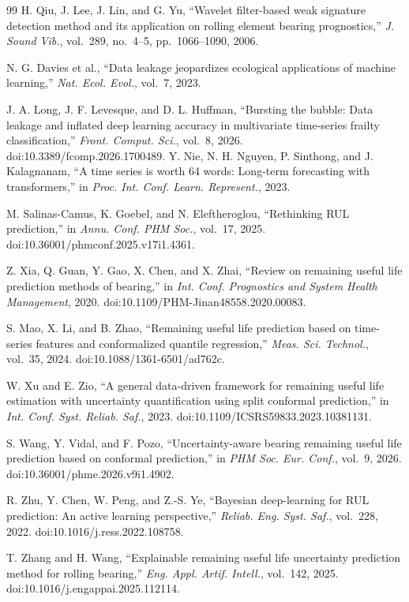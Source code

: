 \documentclass[pdflatex,sn-mathphys-num]{sn-jnl}
\begin{document}
\begin{thebibliography}{99}
H. Qiu, J. Lee, J. Lin, and G. Yu,
``Wavelet filter-based weak signature detection method and its application on rolling element bearing prognostics,''
\textit{J. Sound Vib.}, vol.~289, no.~4--5, pp.~1066--1090, 2006.

N. G. Davies et al.,
``Data leakage jeopardizes ecological applications of machine learning,''
\textit{Nat. Ecol. Evol.}, vol.~7, 2023.

J. A. Long, J. F. Levesque, and D. L. Huffman,
``Bursting the bubble: Data leakage and inflated deep learning accuracy in multivariate time-series frailty classification,''
\textit{Front. Comput. Sci.}, vol.~8, 2026. doi:10.3389/fcomp.2026.1700489.
Y. Nie, N. H. Nguyen, P. Sinthong, and J. Kalagnanam,
``A time series is worth 64 words: Long-term forecasting with transformers,''
in \textit{Proc. Int. Conf. Learn. Represent.}, 2023.


M. Salinas-Camus, K. Goebel, and N. Eleftheroglou,
``Rethinking RUL prediction,'' in \textit{Annu. Conf. PHM Soc.}, vol.~17, 2025. doi:10.36001/phmconf.2025.v17i1.4361.

Z. Xia, Q. Guan, Y. Gao, X. Chen, and X. Zhai,
``Review on remaining useful life prediction methods of bearing,'' in \textit{Int. Conf. Prognostics and System Health Management}, 2020. doi:10.1109/PHM-Jinan48558.2020.00083.

S. Mao, X. Li, and B. Zhao,
``Remaining useful life prediction based on time-series features and conformalized quantile regression,'' \textit{Meas. Sci. Technol.}, vol.~35, 2024. doi:10.1088/1361-6501/ad762c.

W. Xu and E. Zio,
``A general data-driven framework for remaining useful life estimation with uncertainty quantification using split conformal prediction,'' in \textit{Int. Conf. Syst. Reliab. Saf.}, 2023. doi:10.1109/ICSRS59833.2023.10381131.

S. Wang, Y. Vidal, and F. Pozo,
``Uncertainty-aware bearing remaining useful life prediction based on conformal prediction,'' in \textit{PHM Soc. Eur. Conf.}, vol.~9, 2026. doi:10.36001/phme.2026.v9i1.4902.

R. Zhu, Y. Chen, W. Peng, and Z.-S. Ye,
``Bayesian deep-learning for RUL prediction: An active learning perspective,'' \textit{Reliab. Eng. Syst. Saf.}, vol.~228, 2022. doi:10.1016/j.ress.2022.108758.

T. Zhang and H. Wang,
``Explainable remaining useful life uncertainty prediction method for rolling bearing,'' \textit{Eng. Appl. Artif. Intell.}, vol.~142, 2025. doi:10.1016/j.engappai.2025.112114.
\end{thebibliography}
\end{document}
